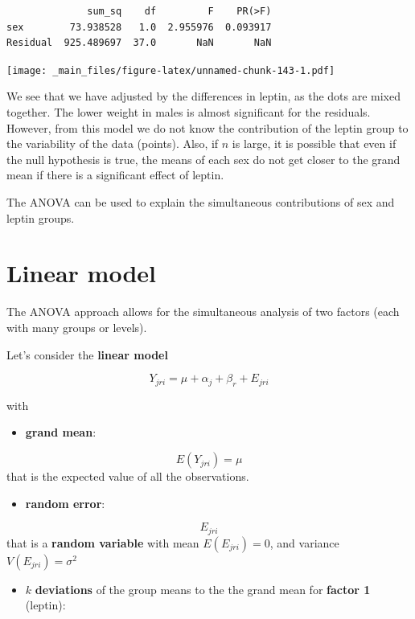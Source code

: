 \documentclass[
]{book}
\providecommand{\tightlist}{%
  \setlength{\itemsep}{0pt}\setlength{\parskip}{0pt}}
\begin{document}
\begin{verbatim}
              sum_sq    df         F    PR(>F)
sex        73.938528   1.0  2.955976  0.093917
Residual  925.489697  37.0       NaN       NaN
\end{verbatim}

\texttt{[image: \_main\_files/figure-latex/unnamed-chunk-143-1.pdf]}

We see that we have adjusted by the differences in leptin, as the dots are mixed together. The lower weight in males is almost significant for the residuals. However, from this model we do not know the contribution of the leptin group to the variability of the data (points). Also, if \(n\) is large, it is possible that even if the null hypothesis is true, the means of each sex do not get closer to the grand mean if there is a significant effect of leptin.

The ANOVA can be used to explain the simultaneous contributions of sex and leptin groups.

\hypertarget{linear-model-1}{%
\section{Linear model}\label{linear-model-1}}

The ANOVA approach allows for the simultaneous analysis of two factors (each with many groups or levels).

Let's consider the \textbf{linear model}

\[Y_{jri} = \mu + \alpha_j + \beta_r + E_{jri}\]

with

\begin{itemize}
\tightlist
\item
  \textbf{grand mean}:
\end{itemize}

\[E(Y_{jri})=\mu\]
that is the expected value of all the observations.

\begin{itemize}
\tightlist
\item
  \textbf{random error}:
\end{itemize}

\[E_{jri}\] that is a \textbf{random variable} with mean \(E(E_{jri})=0\), and variance \(V(E_{jri})=\sigma^2\)

\begin{itemize}
\tightlist
\item
  \(k\) \textbf{deviations} of the group means to the the grand mean for \textbf{factor 1} (leptin):
\end{itemize}
\end{document}
